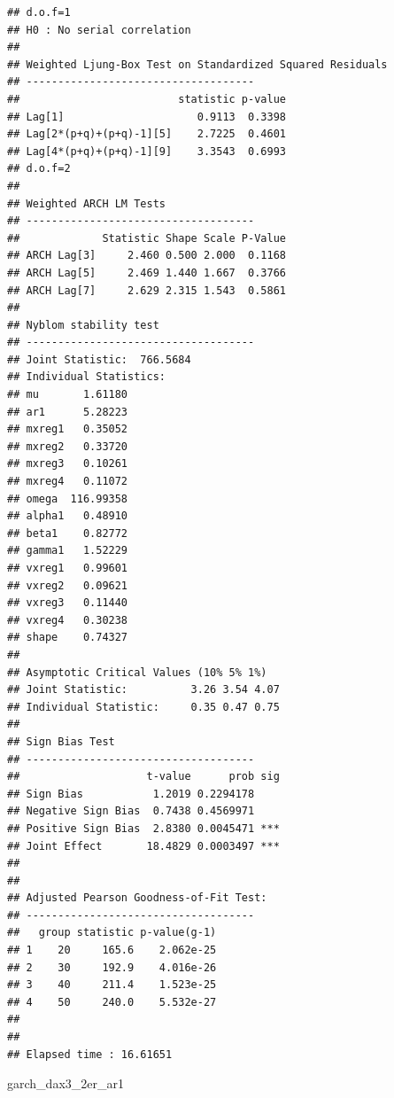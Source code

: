 \documentclass[
  11pt,
]{article}
\newenvironment{Shaded}{\begin{snugshade}}{\end{snugshade}}
\newcommand{\NormalTok}[1]{#1}
\begin{document}
\begin{verbatim}
## d.o.f=1
## H0 : No serial correlation
## 
## Weighted Ljung-Box Test on Standardized Squared Residuals
## ------------------------------------
##                         statistic p-value
## Lag[1]                     0.9113  0.3398
## Lag[2*(p+q)+(p+q)-1][5]    2.7225  0.4601
## Lag[4*(p+q)+(p+q)-1][9]    3.3543  0.6993
## d.o.f=2
## 
## Weighted ARCH LM Tests
## ------------------------------------
##             Statistic Shape Scale P-Value
## ARCH Lag[3]     2.460 0.500 2.000  0.1168
## ARCH Lag[5]     2.469 1.440 1.667  0.3766
## ARCH Lag[7]     2.629 2.315 1.543  0.5861
## 
## Nyblom stability test
## ------------------------------------
## Joint Statistic:  766.5684
## Individual Statistics:                
## mu       1.61180
## ar1      5.28223
## mxreg1   0.35052
## mxreg2   0.33720
## mxreg3   0.10261
## mxreg4   0.11072
## omega  116.99358
## alpha1   0.48910
## beta1    0.82772
## gamma1   1.52229
## vxreg1   0.99601
## vxreg2   0.09621
## vxreg3   0.11440
## vxreg4   0.30238
## shape    0.74327
## 
## Asymptotic Critical Values (10% 5% 1%)
## Joint Statistic:          3.26 3.54 4.07
## Individual Statistic:     0.35 0.47 0.75
## 
## Sign Bias Test
## ------------------------------------
##                    t-value      prob sig
## Sign Bias           1.2019 0.2294178    
## Negative Sign Bias  0.7438 0.4569971    
## Positive Sign Bias  2.8380 0.0045471 ***
## Joint Effect       18.4829 0.0003497 ***
## 
## 
## Adjusted Pearson Goodness-of-Fit Test:
## ------------------------------------
##   group statistic p-value(g-1)
## 1    20     165.6    2.062e-25
## 2    30     192.9    4.016e-26
## 3    40     211.4    1.523e-25
## 4    50     240.0    5.532e-27
## 
## 
## Elapsed time : 16.61651
\end{verbatim}

\begin{Shaded}
\begin{Highlighting}[]
\NormalTok{garch_dax3_2er_ar1}
\end{Highlighting}
\end{Shaded}
\end{document}
